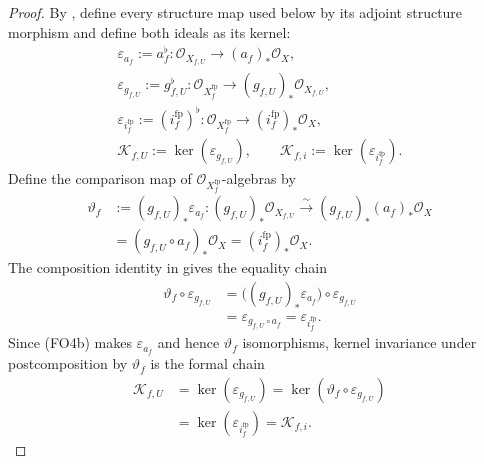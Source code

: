 \begin{proof}
  By , define every structure map
  used below by its adjoint structure morphism and define both ideals as its
  kernel:
  \[
  \begin{gathered}
    \varepsilon_{a_f}:=a_f^\flat\colon
      \mathcal O_{X_{f,U}}\to(a_f)_*\mathcal O_X,\\
    \varepsilon_{g_{f,U}}:=g_{f,U}^\flat\colon
      \mathcal O_{X_f^{\mathrm{fp}}}
        \to(g_{f,U})_*\mathcal O_{X_{f,U}},\\
    \varepsilon_{i_f^{\mathrm{fp}}}:=(i_f^{\mathrm{fp}})^\flat\colon
      \mathcal O_{X_f^{\mathrm{fp}}}
        \to(i_f^{\mathrm{fp}})_*\mathcal O_X,\\
    \mathcal K_{f,U}:=\ker(\varepsilon_{g_{f,U}}),
    \qquad
    \mathcal K_{f,i}:=\ker(\varepsilon_{i_f^{\mathrm{fp}}}).
  \end{gathered}                                                    \tag{FO5}
  \]
  Define the comparison map of $\mathcal O_{X_f^{\mathrm{fp}}}$-algebras by
  \[
  \begin{aligned}
    \vartheta_f
      &:=(g_{f,U})_*\varepsilon_{a_f}\colon
        (g_{f,U})_*\mathcal O_{X_{f,U}}
          \xrightarrow{\sim}
        (g_{f,U})_*(a_f)_*\mathcal O_X\\
      &=(g_{f,U}\circ a_f)_*\mathcal O_X
       =(i_f^{\mathrm{fp}})_*\mathcal O_X.
  \end{aligned}                                                     \tag{FO5a}
  \]
  The composition identity in
   gives the equality chain
  \[
  \begin{aligned}
    \vartheta_f\circ\varepsilon_{g_{f,U}}
      &=\bigl((g_{f,U})_*\varepsilon_{a_f}\bigr)
        \circ\varepsilon_{g_{f,U}}\\
      &=\varepsilon_{g_{f,U}\circ a_f}
       =\varepsilon_{i_f^{\mathrm{fp}}}.
  \end{aligned}                                                     \tag{FO5b}
  \]
  Since (FO4b) makes $\varepsilon_{a_f}$ and hence $\vartheta_f$
  isomorphisms, kernel invariance under postcomposition by $\vartheta_f$ is
  the formal chain
  \[
  \begin{aligned}
    \mathcal K_{f,U}
      &=\ker(\varepsilon_{g_{f,U}})
       =\ker(\vartheta_f\circ\varepsilon_{g_{f,U}})\\
      &=\ker(\varepsilon_{i_f^{\mathrm{fp}}})
       =\mathcal K_{f,i}.
  \end{aligned}                                                     \tag{FO6}
  \]


\end{proof}
